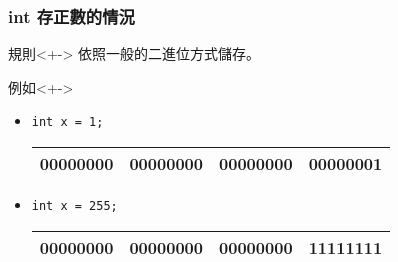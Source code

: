\documentclass[utf8]{beamer}
\begin{document}
\begin{CJK}{UTF8}{bkai}
\begin{frame}[fragile]
  \frametitle{int 存正數的情況}
  \begin{alertblock}{規則}<+->
  依照一般的二進位方式儲存。
  \end{alertblock}
  \begin{exampleblock}{例如}<+->
    \begin{itemize}
    \item \lstinline{int x = 1;}{}
      \begin{table}[h]
      \begin{tabular}{|c|c|c|c|}
        \hline
        \alert{0}0000000 & 00000000 & 00000000 & 0000000\alert{1}\\
        \hline
      \end{tabular}
      \end{table}
    \item<+-> \lstinline{int x = 255;}{}
      \begin{table}[h]
      \begin{tabular}{|c|c|c|c|}
        \hline
        \alert{0}0000000 & 00000000 & 00000000 & \alert{11111111}\\
        \hline
      \end{tabular}
      \end{table}
    \end{itemize}
  \end{exampleblock}
\end{frame}


\end{CJK}
\end{document}
